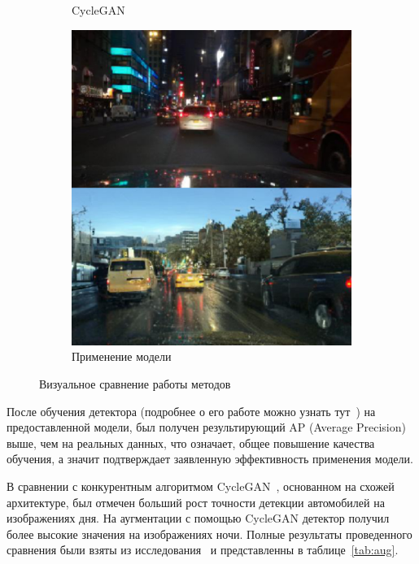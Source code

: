 \documentclass[11pt,a4paper]{extarticle}
\begin{document}
{\begin{figure}[ht]
\begin{subfigure}[ht]{0.32\textwidth}
					\caption{CycleGAN~\cite{CycleGAN}}
				\end{subfigure}
				\begin{subfigure}[ht]{0.32\textwidth}
					\includegraphics[width=\textwidth]{img/aug_model}
					\caption{Применение модели}
				\end{subfigure}
				\caption{Визуальное сравнение работы методов}
				\label{pic:aug_results}
			\end{figure}

			\noindent
			После обучения детектора (подробнее о его работе можно узнать тут~\cite{disser_aug}) на предоставленной модели, был получен результирующий AP (Average Precision) выше, чем на реальных данных, что означает, общее повышение качества обучения, а значит подтверждает заявленную эффективность применения модели.
			
			В сравнении с конкурентным алгоритмом CycleGAN~\cite{CycleGAN}, основанном на схожей архитектуре, был отмечен больший рост точности детекции автомобилей на изображениях дня.
			На аугментации с помощью CycleGAN детектор получил более высокие значения на изображениях ночи.
			Полные результаты проведенного сравнения были взяты из исследования~\cite{disser_aug} и представленны в таблице~\ref{tab:aug}.

}
\end{document}
